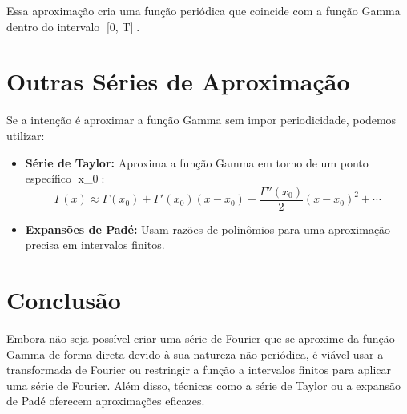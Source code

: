 \documentclass[a4paper,12pt]{article}
\begin{document}
Essa aproximação cria uma função periódica que coincide com a função Gamma dentro do intervalo [0, T].

\section*{Outras Séries de Aproximação}
Se a intenção é aproximar a função Gamma sem impor periodicidade, podemos utilizar:
\begin{itemize}
    \item \textbf{Série de Taylor:} Aproxima a função Gamma em torno de um ponto específico x_0:
\[
    \Gamma(x) \approx \Gamma(x_0) + \Gamma'(x_0)(x - x_0) + \frac{\Gamma''(x_0)}{2}(x - x_0)^2 + \cdots
\]
    \item \textbf{Expansões de Padé:} Usam razões de polinômios para uma aproximação precisa em intervalos finitos.
\end{itemize}

\section*{Conclusão}
Embora não seja possível criar uma série de Fourier que se aproxime da função Gamma de forma direta devido à sua natureza não periódica, é viável usar a transformada de Fourier ou restringir a função a intervalos finitos para aplicar uma série de Fourier. Além disso, técnicas como a série de Taylor ou a expansão de Padé oferecem aproximações eficazes.
\end{document}
